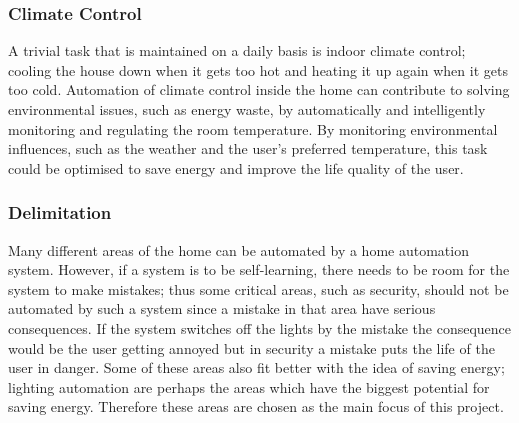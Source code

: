 
\subsubsection{Climate Control}
\label{sub:Room Temperature Regulation}
A trivial task that is maintained on a daily basis is indoor climate control;
cooling the house down when it gets too hot and heating it up again when it gets too cold.
Automation of climate control inside the home can contribute to solving environmental issues, such as energy waste,
by automatically and intelligently monitoring and regulating the room temperature.
By monitoring environmental influences, such as the weather and the user's preferred temperature,
this task could be optimised to save energy and improve the life quality of the user.

\subsubsection{Delimitation}
Many different areas of the home can be automated by a home automation system.
However, if a system is to be self-learning, there needs to be room for the system to make mistakes;
thus some critical areas, such as security, should not be automated by such a system since a mistake in that area have serious consequences.
If the system switches off the lights by the mistake the consequence would be the user getting annoyed but in security a mistake puts the life of the user in danger.
Some of these areas also fit better with the idea of saving energy;
lighting automation are perhaps the areas which have the biggest potential for saving energy.
Therefore these areas are chosen as the main focus of this project.
